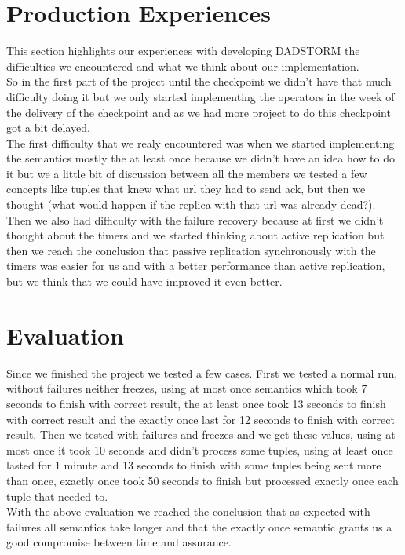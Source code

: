 \documentclass[times, 10pt, twocolumn]{article}
\begin{document}
\section{Production Experiences}
This section highlights our experiences with developing DADSTORM the difficulties we encountered and what we think about our implementation.
\\So in the first part of the project until the checkpoint we didn't have that much difficulty doing it but we only started implementing the operators in the week of the delivery of the checkpoint and as we had more project to do this checkpoint got a bit delayed.
\\The first difficulty that we realy encountered was when we started implementing the semantics mostly the at least once because we didn't have an idea how to do it but we a little bit of discussion between all the members we tested a few concepts like tuples that knew what url they had to send ack, but then we thought (what would happen if the replica with that url was already dead?).
\\Then we also had difficulty with the failure recovery because at first we didn't thought about the timers and we started thinking about active replication but then we reach the conclusion that passive replication synchronously with the timers was easier for us and with a better performance than active replication, but we think that we could have improved it even better. 




\section{Evaluation}
Since we finished the project we tested a few cases. First we tested a normal run, without failures neither freezes, using at most once semantics which took 7 seconds to finish with correct result, the at least once took 13 seconds to finish with correct result and the exactly once last for 12 seconds to finish with correct result. Then we tested with failures and freezes and we get these values, using at most once it took 10 seconds and didn't process some tuples, using at least once lasted for 1 minute and 13 seconds to finish with some tuples being sent more than once, exactly once took 50 seconds to finish but processed exactly once each tuple that needed to.
\\With the above evaluation we reached the conclusion that as expected with failures all semantics take longer and that the exactly once semantic grants us a good compromise between time and assurance.
\end{document}
